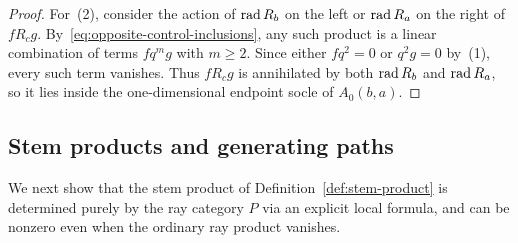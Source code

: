 \begin{proof}
\smallskip
For~(2), consider the action of $\operatorname{rad} R_b$ on the left or $\operatorname{rad} R_a$ on the right of $fR_cg$. By~\eqref{eq:opposite-control-inclusions}, any such product is a linear combination of terms $fq^mg$ with $m\geq2$. Since either $fq^2=0$ or $q^2g=0$ by~(1), every such term vanishes. Thus $fR_cg$ is annihilated by both $\operatorname{rad} R_b$ and $\operatorname{rad} R_a$, so it lies inside the one-dimensional endpoint socle of $A_0(b,a)$.
\end{proof}

\subsection{Stem products and generating paths}

We next show that the stem product of Definition~\ref{def:stem-product} is determined purely by the ray category $P$ via an explicit local formula, and can be nonzero even when the ordinary ray product vanishes.

